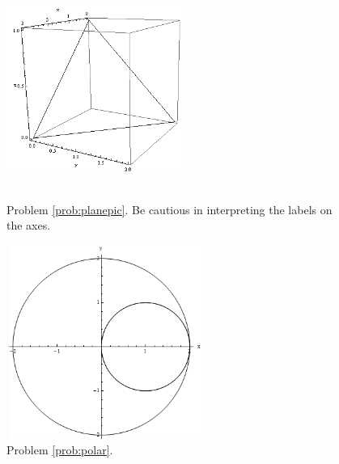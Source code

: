 
        \begin{figure}[ht]
            \centering
            \begin{minipage}[t]{0.45\linewidth}
                \includegraphics[height=180pt,width=167pt]{f12_final_fig1}
                \caption{Problem \ref{prob:planepic}. Be cautious in interpreting the labels on the axes.}
            \end{minipage}
            \hspace{0.05\linewidth}
            \begin{minipage}[t]{0.45\linewidth}
            \centering
                \includegraphics[height=180pt,width=182pt]{f12_final_fig2}
                \caption{Problem \ref{prob:polar}.}
            \end{minipage}%
        \end{figure}
